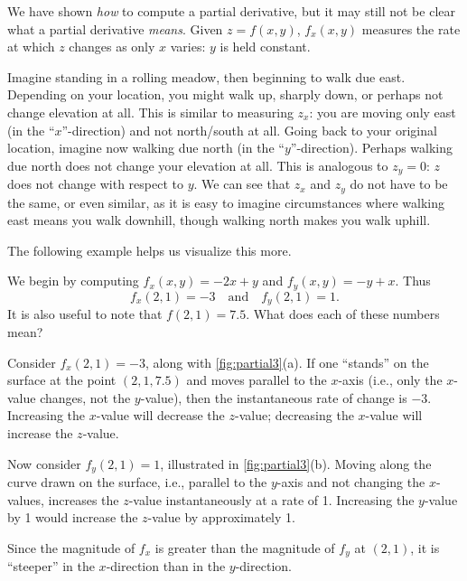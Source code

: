 We have shown \textit{how} to compute a partial derivative, but it may still not be clear what a partial derivative \textit{means}. Given $z=f(x,y)$, $f_x(x,y)$ measures the rate at which $z$ changes as only $x$ varies: $y$ is held constant. 

Imagine standing in a rolling meadow, then beginning to walk due east. Depending on your location, you might walk up, sharply down, or perhaps not change elevation at all. This is similar to measuring $z_x$: you are moving only east (in the ``$x$''-direction) and not north/south at all. Going back to your original location, imagine now walking due north (in the ``$y$''-direction). Perhaps walking due north does not change your elevation at all. This is analogous to $z_y=0$: $z$ does not change with respect to $y$. We can see that $z_x$ and $z_y$ do not have to be the same, or even similar, as it is easy to imagine circumstances where walking east means you walk downhill, though walking north makes you walk uphill. 

The following example helps us visualize this more.

{We begin by computing $f_x(x,y) = -2x+y$ and $f_y(x,y) = -y+x$. Thus
\[f_x(2,1) = -3 \quad \text{and}\quad f_y(2,1) = 1.\]
It is also useful to note that $f(2,1) = 7.5$. What does each of these numbers mean?


Consider $f_x(2,1)=-3$, along with \autoref{fig:partial3}(a). If one ``stands'' on the surface at the point $(2,1,7.5)$ and moves parallel to the $x$-axis (i.e., only the $x$-value changes, not the $y$-value), then the instantaneous rate of change is $-3$. Increasing the $x$-value will decrease the $z$-value; decreasing the $x$-value will increase the $z$-value.

Now consider $f_y(2,1)=1$, illustrated in \autoref{fig:partial3}(b). Moving along the curve drawn on the surface, i.e., parallel to the $y$-axis and not changing the $x$-values, increases the $z$-value instantaneously at a rate of 1. Increasing the $y$-value by 1 would increase the $z$-value by approximately 1.

Since the magnitude of $f_x$ is greater than the magnitude of $f_y$ at $(2,1)$, it is ``steeper'' in the $x$-direction than in the $y$-direction.}


